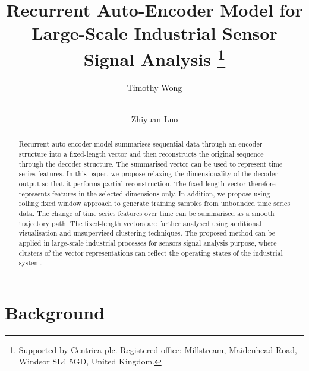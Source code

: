 \documentclass[runningheads]{llncs}
\begin{document}
	
\title{Recurrent Auto-Encoder Model for\\ Large-Scale Industrial Sensor Signal Analysis
	\thanks{Supported by Centrica plc. Registered office: Millstream, Maidenhead Road, Windsor SL4 5GD, United Kingdom.}}

\author{Timothy Wong \and \\
Zhiyuan Luo}



\maketitle

\begin{abstract}

Recurrent auto-encoder model summarises sequential data through an encoder structure into a fixed-length vector and then reconstructs the original sequence through the decoder structure. The summarised vector can be used to represent time series features. In this paper, we propose relaxing the dimensionality of the decoder output so that it performs partial reconstruction. The fixed-length vector therefore represents features in the selected dimensions only. In addition, we propose using rolling fixed window approach to generate training samples from unbounded time series data. The change of time series features over time can be summarised as a smooth trajectory path. The fixed-length vectors are further analysed using additional visualisation and unsupervised clustering techniques. The proposed method can be applied in large-scale industrial processes for sensors signal analysis purpose, where clusters of the vector representations can reflect the operating states of the industrial system.

\end{abstract}
%
%
%

\section{Background}
\end{document}
